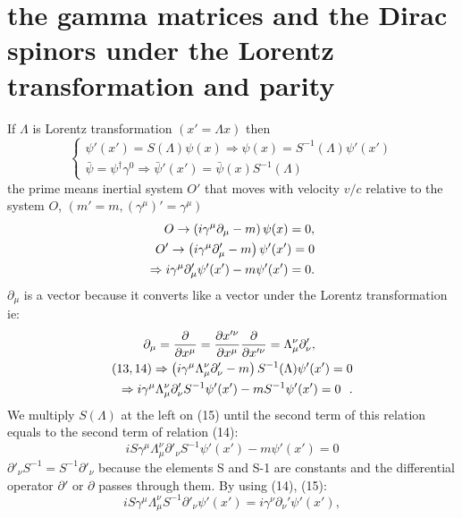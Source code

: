 \documentclass[twocolumn,aps,prb,showpacs]{revtex4-1}
\begin{document}
\section{the gamma matrices and the Dirac spinors under the Lorentz transformation and parity}
If $ \Lambda $ is Lorentz transformation $ (x'=\Lambda x) $ then 
\begin{equation}
	\begin{cases}
		\psi '(x')=S(\Lambda)\psi(x)\Rightarrow\psi(x)
		=S^{-1}(\Lambda)\psi '(x')\\
		\bar{\psi}
		=\psi^{\dag}\gamma^{0}\Rightarrow
		\bar{\psi}'(x')=\bar{\psi}
		(x)S^{-1}(\Lambda)
	\end{cases}
\end{equation}
the prime means inertial system $ O' $ that moves with velocity $ v/c $ relative to the system $ O $, $ (m'=m,(\gamma^{\mu})'=\gamma^{\mu}) $\\
\begin{align}
	O\rightarrow\left( i\gamma^{\mu}\partial_{\mu}-m\right)\psi(x)=0 
	,\notag \\
	O'\rightarrow\left( i\gamma^{\mu}\partial_{\mu}'-m\right)\psi'(x')=0 \notag \\
	\Rightarrow i\gamma^{\mu}\partial_{\mu}'\psi'(x') -m\psi'(x')=0.
\end{align}
$ \partial_{\mu} $ is a vector because it converts like a vector under the Lorentz transformation ie:
\begin{align}
	\partial_{\mu}=\frac{\partial}{\partial x^{\mu}} =\frac{\partial x '^{\nu}}{\partial x^{\mu}}\frac{\partial}{\partial x '^{\nu}}=\Lambda^{\nu}_{\mu}\partial '_{\nu}, \ \ \ \ \ \ \ \ \ \notag \\
	(13,14)\Rightarrow \left( i\gamma^{\mu}\Lambda^{\nu}_{\mu}\partial '_{\nu}-m\right) S^{-1}(\Lambda)\psi '(x')=0 \notag \\
	\Rightarrow i\gamma^{\mu}\Lambda^{\nu}_{\mu}\partial '_{\nu}S^{-1}\psi '(x')-mS^{-1}\psi '(x')=0  \ \ .
\end{align}
We multiply $ S(\Lambda) $ at the left on (15) until the second term of this relation equals to the second term of relation (14):
\begin{equation}
	iS\gamma^{\mu}\Lambda_{\mu}^{\nu}\partial ' _{\nu}S^{-1}\psi '(x')-m\psi '(x')=0
\end{equation}
$ \partial ' _{\nu}S^{-1}=S^{-1}\partial ' _{\nu} $ because the elements S and S-1 are constants and the differential operator $ \partial ' $ or $ \partial $ passes through them. By using (14), (15):
\begin{equation}  
	iS\gamma^{\mu}\Lambda_{\mu}^{\nu}S^{-1}\partial ' _{\nu}\psi '(x')=i\gamma^{\nu}\partial_{\nu}'\psi'(x'),
\end{equation}
\end{document}
